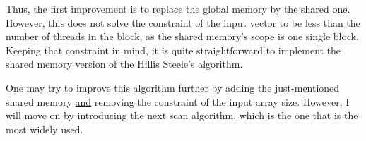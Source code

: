 Thus, the first improvement is to replace the global memory by the shared one. However, this does not solve the constraint 
of the input vector to be less than the number of threads in the block, as the shared memory's scope is one single block. 
Keeping that constraint in mind, it is quite straightforward to implement the shared memory version of the Hillis Steele's 
algorithm. 


One may try to improve this algorithm further by adding the just-mentioned shared memory \underline{and} removing the constraint of the input array size.
However, I will move on by introducing the next scan algorithm, which is the one that is the most widely used.







